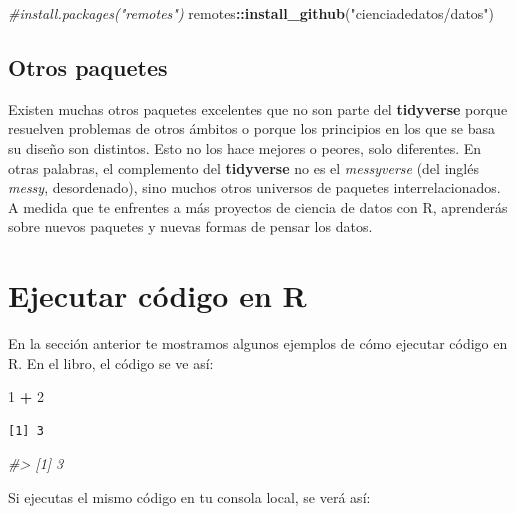 \documentclass[11pt,oneside]{report}
\newenvironment{Shaded}{\begin{snugshade}}{\end{snugshade}}
\newcommand{\CommentTok}[1]{\textcolor[rgb]{0.56,0.35,0.01}{\textit{#1}}}
\newcommand{\DecValTok}[1]{\textcolor[rgb]{0.00,0.00,0.81}{#1}}
\newcommand{\KeywordTok}[1]{\textcolor[rgb]{0.13,0.29,0.53}{\textbf{#1}}}
\newcommand{\NormalTok}[1]{#1}
\newcommand{\OperatorTok}[1]{\textcolor[rgb]{0.81,0.36,0.00}{\textbf{#1}}}
\newcommand{\StringTok}[1]{\textcolor[rgb]{0.31,0.60,0.02}{#1}}
\begin{document}
\begin{Shaded}
\begin{Highlighting}[]
\CommentTok{#install.packages("remotes")}
\NormalTok{remotes}\OperatorTok{::}\KeywordTok{install_github}\NormalTok{(}\StringTok{"cienciadedatos/datos"}\NormalTok{)}
\end{Highlighting}
\end{Shaded}

\hypertarget{otros-paquetes}{%
\subsection{Otros paquetes}\label{otros-paquetes}}

Existen muchas otros paquetes excelentes que no son parte del
\textbf{tidyverse} porque resuelven problemas de otros ámbitos o porque
los principios en los que se basa su diseño son distintos. Esto no los
hace mejores o peores, solo diferentes. En otras palabras, el
complemento del \textbf{tidyverse} no es el \emph{messyverse} (del
inglés \emph{messy}, desordenado), sino muchos otros universos de
paquetes interrelacionados. A medida que te enfrentes a más proyectos de
ciencia de datos con R, aprenderás sobre nuevos paquetes y nuevas formas
de pensar los datos.

\hypertarget{ejecutar-cuxf3digo-en-r}{%
\section{Ejecutar código en R}\label{ejecutar-cuxf3digo-en-r}}

En la sección anterior te mostramos algunos ejemplos de cómo ejecutar
código en R. En el libro, el código se ve así:

\begin{Shaded}
\begin{Highlighting}[]
\DecValTok{1} \OperatorTok{+}\StringTok{ }\DecValTok{2}
\end{Highlighting}
\end{Shaded}

\begin{verbatim}
[1] 3
\end{verbatim}

\begin{Shaded}
\begin{Highlighting}[]
\CommentTok{#> [1] 3}
\end{Highlighting}
\end{Shaded}

Si ejecutas el mismo código en tu consola local, se verá así:
\end{document}

